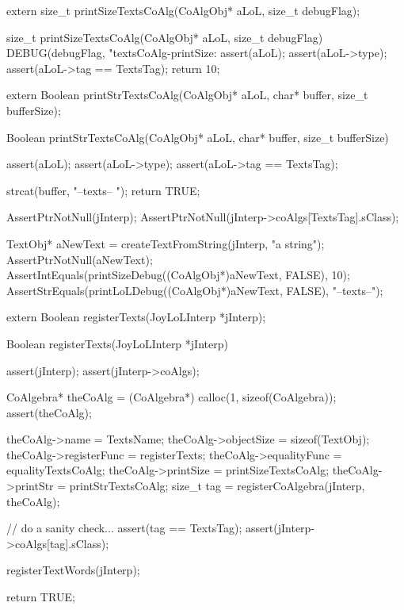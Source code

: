 \startCHeader
extern size_t printSizeTextsCoAlg(CoAlgObj* aLoL, size_t debugFlag);
\stopCHeader

\startCCode
size_t printSizeTextsCoAlg(CoAlgObj* aLoL, size_t debugFlag) {
  DEBUG(debugFlag, "textsCoAlg-printSize: %
  assert(aLoL);
  assert(aLoL->type);
  assert(aLoL->tag == TextsTag);
  return 10;
}
\stopCCode

\startCHeader
extern Boolean printStrTextsCoAlg(CoAlgObj* aLoL,
                                 char* buffer, size_t bufferSize);
\stopCHeader

\startCCode
Boolean printStrTextsCoAlg(CoAlgObj* aLoL,
                          char* buffer, size_t bufferSize) {
  assert(aLoL);
  assert(aLoL->type);
  assert(aLoL->tag == TextsTag);

  strcat(buffer, "--texts-- ");
  return TRUE;
}
\stopCCode


\startCTest
  AssertPtrNotNull(jInterp);
  AssertPtrNotNull(jInterp->coAlgs[TextsTag].sClass);

  TextObj* aNewText = createTextFromString(jInterp, "a string");
  AssertPtrNotNull(aNewText);
  AssertIntEquals(printSizeDebug((CoAlgObj*)aNewText, FALSE), 10);
  AssertStrEquals(printLoLDebug((CoAlgObj*)aNewText, FALSE), "--texts--");
\stopCTest
\stopTestCase
\stopTestSuite

\startTestSuite[registerTexts]

\startCHeader
extern Boolean registerTexts(JoyLoLInterp *jInterp);
\stopCHeader

\startCCode
Boolean registerTexts(JoyLoLInterp *jInterp) {
  assert(jInterp);
  assert(jInterp->coAlgs);
  
  CoAlgebra* theCoAlg    = (CoAlgebra*) calloc(1, sizeof(CoAlgebra));
  assert(theCoAlg);
  
  theCoAlg->name         = TextsName;
  theCoAlg->objectSize   = sizeof(TextObj);
  theCoAlg->registerFunc = registerTexts;
  theCoAlg->equalityFunc = equalityTextsCoAlg;
  theCoAlg->printSize    = printSizeTextsCoAlg;
  theCoAlg->printStr     = printStrTextsCoAlg;
  size_t tag = registerCoAlgebra(jInterp, theCoAlg);
  
  // do a sanity check...
  assert(tag == TextsTag);
  assert(jInterp->coAlgs[tag].sClass);
  
  registerTextWords(jInterp);
  
  return TRUE;
}
\stopCCode


